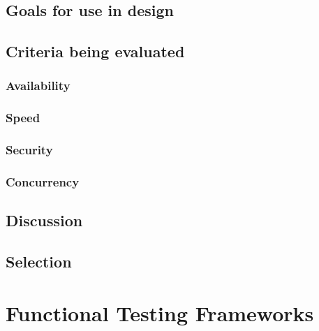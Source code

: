\documentclass[10pt,letterpaper,onecolumn,draftclsnofoot]{IEEEtran}
\begin{document}
\subsubsection{}

\subsubsection{}

\subsubsection{}

\subsection{Goals for use in design}

\subsection{Criteria being evaluated}

\subsubsection{Availability}

\subsubsection{Speed}

\subsubsection{Security}

\subsubsection{Concurrency}

\subsection{Discussion}

\subsection{Selection}

\section{Functional Testing Frameworks}
\end{document}
